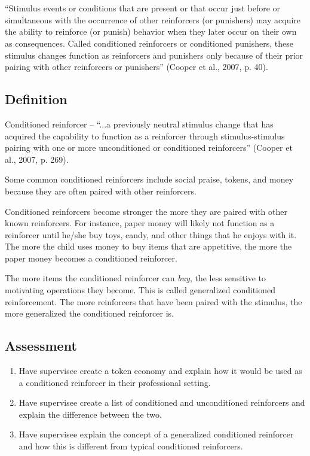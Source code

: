 \clearpage \section[\foureEleven{}]{\foureEleven{}%
              }
``Stimulus events or conditions that are present or that occur just before or simultaneous with the occurrence of other reinforcers (or punishers) may acquire the ability to reinforce (or punish) behavior when they later occur on their own as consequences. Called conditioned reinforcers or conditioned punishers, these stimulus changes function as reinforcers and punishers only because of their prior pairing with other reinforcers or punishers'' (Cooper et al., 2007, p. 40).

\subsection{Definition}
Conditioned reinforcer – ``...a previously neutral stimulus change that has acquired the capability to function as a reinforcer through stimulus-stimulus pairing with one or more unconditioned or conditioned reinforcers'' (Cooper et al., 2007, p. 269).

Some common conditioned reinforcers include social praise, tokens, and money because they are often paired with other reinforcers. 

Conditioned reinforcers become stronger the more they are paired with other known reinforcers. For instance, paper money will likely not function as a reinforcer until he/she buy toys, candy, and other things that he enjoys with it. The more the child uses money to buy items that are appetitive, the more the paper money becomes a conditioned reinforcer.

The more items the conditioned reinforcer can \textit{buy}, the less sensitive to motivating operations they become. This is called generalized conditioned reinforcement. The more reinforcers that have been paired with the stimulus, the more generalized the conditioned reinforcer is.
%
\subsection{Assessment}
\begin{enumerate}
\item Have supervisee create a token economy and explain how it would be used as a conditioned reinforcer in their professional setting. 
\item Have supervisee create a list of conditioned and unconditioned reinforcers and explain the difference between the two. 
\item Have supervisee explain the concept of a generalized conditioned reinforcer and how this is different from typical conditioned reinforcers.
%
\end{enumerate}
%
